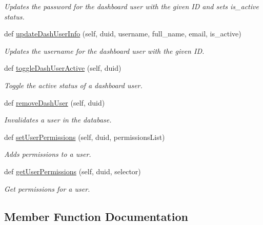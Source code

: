 \begin{DoxyCompactItemize}
\begin{DoxyCompactList}\small\item\em Updates the password for the dashboard user with the given ID and sets is\+\_\+active status. \end{DoxyCompactList}\item 
def \hyperlink{classhandler_1_1user_1_1_user_handler_ae252ab004847bf2c18292d5ff166a945}{update\+Dash\+User\+Info} (self, duid, username, full\+\_\+name, email, is\+\_\+active)
\begin{DoxyCompactList}\small\item\em Updates the username for the dashboard user with the given ID. \end{DoxyCompactList}\item 
def \hyperlink{classhandler_1_1user_1_1_user_handler_aa98936c6961b8de393b8fd3f76882170}{toggle\+Dash\+User\+Active} (self, duid)
\begin{DoxyCompactList}\small\item\em Toggle the active status of a dashboard user. \end{DoxyCompactList}\item 
def \hyperlink{classhandler_1_1user_1_1_user_handler_ac698bb4b5305f31845db90f0932e95ad}{remove\+Dash\+User} (self, duid)
\begin{DoxyCompactList}\small\item\em Invalidates a user in the database. \end{DoxyCompactList}\item 
def \hyperlink{classhandler_1_1user_1_1_user_handler_a0c8766b4b476bc123a2306aeccd2b52c}{set\+User\+Permissions} (self, duid, permissions\+List)
\begin{DoxyCompactList}\small\item\em Adds permissions to a user. \end{DoxyCompactList}\item 
def \hyperlink{classhandler_1_1user_1_1_user_handler_aa8e4dd85347c5126bb48383db010fa39}{get\+User\+Permissions} (self, duid, selector)
\begin{DoxyCompactList}\small\item\em Get permissions for a user. \end{DoxyCompactList}\end{DoxyCompactItemize}


\subsection{Member Function Documentation}
\mbox{\label{classhandler_1_1user_1_1_user_handler_a3d1e4cb462752aa66af5950b89c1feed}} 
